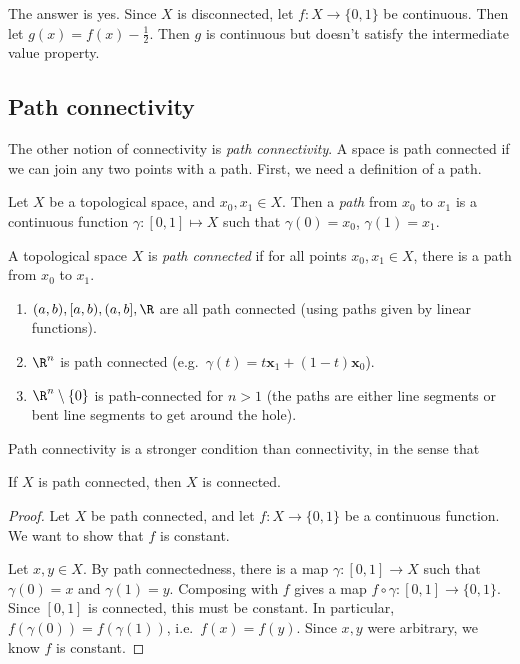 \documentclass[a4paper]{article}
\begin{document}
The answer is yes. Since $X$ is disconnected, let $f: X\to \{0, 1\}$ be continuous. Then let $g(x) = f(x) - \frac{1}{2}$. Then $g$ is continuous but doesn't satisfy the intermediate value property.

\subsection{Path connectivity}
The other notion of connectivity is \emph{path connectivity}. A space is path connected if we can join any two points with a path. First, we need a definition of a path.

\begin{defi}[Path]
  Let $X$ be a topological space, and $x_0, x_1 \in X$. Then a \emph{path} from $x_0$ to $x_1$ is a continuous function $\gamma: [0, 1] \mapsto X$ such that $\gamma(0) = x_0$, $\gamma(1) = x_1$.
\end{defi}

\begin{defi}
  A topological space $X$ is \emph{path connected} if for all points $x_0, x_1 \in X$, there is a path from $x_0$ to $x_1$.
\end{defi}

\begin{eg}\leavevmode
  \begin{enumerate}
    \item $(a, b), [a, b), (a, b], \R$ are all path connected (using paths given by linear functions).
    \item $\R^n$ is path connected (e.g.\ $\gamma (t) = t \mathbf{x}_1 + (1 - t)\mathbf{x}_0$).
    \item $\R^n\setminus \{0\}$ is path-connected for $n > 1$ (the paths are either line segments or bent line segments to get around the hole).
  \end{enumerate}
\end{eg}

Path connectivity is a stronger condition than connectivity, in the sense that
\begin{prop}
  If $X$ is path connected, then $X$ is connected.
\end{prop}

\begin{proof}
  Let $X$ be path connected, and let $f: X \to \{0, 1\}$ be a continuous function. We want to show that $f$ is constant.

  Let $x, y \in X$. By path connectedness, there is a map $\gamma: [0, 1] \to X$ such that $\gamma(0) = x$ and $\gamma(1) = y$. Composing with $f$ gives a map $f \circ \gamma: [0, 1] \to \{0, 1\}$. Since $[0, 1]$ is connected, this must be constant. In particular, $f(\gamma(0)) = f(\gamma(1))$, i.e.\ $f(x) = f(y)$. Since $x, y$ were arbitrary, we know $f$ is constant.
\end{proof}
\end{document}
